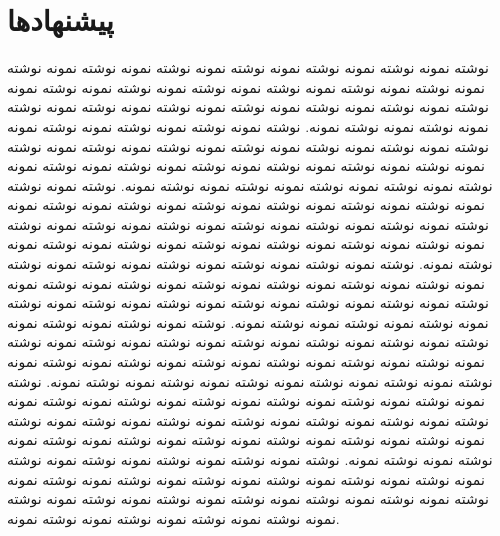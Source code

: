 \section{پیشنهادها}
نوشته نمونه نوشته نمونه نوشته نمونه نوشته نمونه نوشته نمونه نوشته نمونه نوشته نمونه نوشته نمونه نوشته نمونه نوشته نمونه نوشته نمونه نوشته نمونه نوشته نمونه نوشته نمونه نوشته نمونه نوشته نمونه نوشته نمونه نوشته نمونه نوشته نمونه نوشته نمونه نوشته نمونه نوشته نمونه. نوشته نمونه نوشته نمونه نوشته نمونه نوشته نمونه نوشته نمونه نوشته نمونه نوشته نمونه نوشته نمونه نوشته نمونه نوشته نمونه نوشته نمونه نوشته نمونه نوشته نمونه نوشته نمونه نوشته نمونه نوشته نمونه نوشته نمونه نوشته نمونه نوشته نمونه نوشته نمونه نوشته نمونه نوشته نمونه. نوشته نمونه نوشته نمونه نوشته نمونه نوشته نمونه نوشته نمونه نوشته نمونه نوشته نمونه نوشته نمونه نوشته نمونه نوشته نمونه نوشته نمونه نوشته نمونه نوشته نمونه نوشته نمونه نوشته نمونه نوشته نمونه نوشته نمونه نوشته نمونه نوشته نمونه نوشته نمونه نوشته نمونه نوشته نمونه. نوشته نمونه نوشته نمونه نوشته نمونه نوشته نمونه نوشته نمونه نوشته نمونه نوشته نمونه نوشته نمونه نوشته نمونه نوشته نمونه نوشته نمونه نوشته نمونه نوشته نمونه نوشته نمونه نوشته نمونه نوشته نمونه نوشته نمونه نوشته نمونه نوشته نمونه نوشته نمونه نوشته نمونه نوشته نمونه. نوشته نمونه نوشته نمونه نوشته نمونه نوشته نمونه نوشته نمونه نوشته نمونه نوشته نمونه نوشته نمونه نوشته نمونه نوشته نمونه نوشته نمونه نوشته نمونه نوشته نمونه نوشته نمونه نوشته نمونه نوشته نمونه نوشته نمونه نوشته نمونه نوشته نمونه نوشته نمونه نوشته نمونه نوشته نمونه. نوشته نمونه نوشته نمونه نوشته نمونه نوشته نمونه نوشته نمونه نوشته نمونه نوشته نمونه نوشته نمونه نوشته نمونه نوشته نمونه نوشته نمونه نوشته نمونه نوشته نمونه نوشته نمونه نوشته نمونه نوشته نمونه نوشته نمونه نوشته نمونه نوشته نمونه نوشته نمونه نوشته نمونه نوشته نمونه. نوشته نمونه نوشته نمونه نوشته نمونه نوشته نمونه نوشته نمونه نوشته نمونه نوشته نمونه نوشته نمونه نوشته نمونه نوشته نمونه نوشته نمونه نوشته نمونه نوشته نمونه نوشته نمونه نوشته نمونه نوشته نمونه نوشته نمونه نوشته نمونه نوشته نمونه نوشته نمونه نوشته نمونه نوشته نمونه.